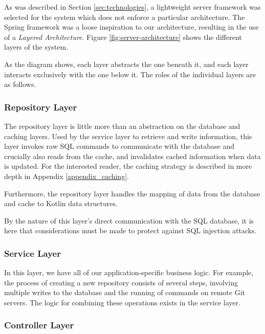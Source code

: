 As was described in Section \ref{sec:technologies}, a lightweight server framework was selected for the system which does not enforce a particular architecture. The Spring framework was a loose inspiration to our architecture, resulting in the use of a \emph{Layered Architecture}. Figure \ref{fig:server-architecture} shows the different layers of the system.

As the diagram shows, each layer abstracts the one beneath it, and each layer interacts exclusively with the one below it. The roles of the individual layers are as follows.


\subsubsection{Repository Layer}

The repository layer is little more than an abstraction on the database and caching layers. Used by the service layer to retrieve and write information, this layer invokes raw SQL commands to communicate with the database and crucially also reads from the cache, and invalidates cached information when data is updated. For the interested reader, the caching strategy is described in more depth in Appendix \ref{appendix_caching}.

Furthermore, the repository layer handles the mapping of data from the database and cache to Kotlin data structures.

By the nature of this layer's direct communication with the SQL database, it is here that considerations must be made to protect against SQL injection attacks.


\subsubsection{Service Layer}

In this layer, we have all of our application-specific business logic. For example, the process of creating a new repository consists of several steps, involving multiple writes to the database and the running of commands on remote Git servers. The logic for combining these operations exists in the service layer.

\subsubsection{Controller Layer}

